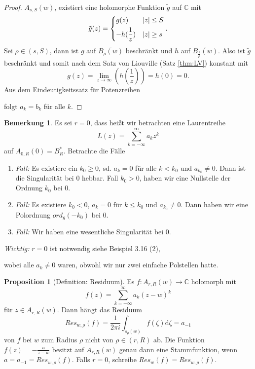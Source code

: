 \documentclass[11pt,titlepage]{article}
\theoremstyle{definition}
\newtheorem{proposition}[theorem]{Proposition}
\newtheorem{remark}[theorem]{Bemerkung}
\theoremstyle{remark}
\begin{document}
\begin{proof}
		$A_{s,S}(w)$, existiert eine holomorphe Funktion $\tilde{g}$ auf $\mathbb{C}$ mit 
		\[ \tilde{g}(z)=\begin{dcases} g(z) & |z|\leq S \\ -h(\frac{1}{z}) & |z| \geq s \end{dcases}. \]
		Sei $\rho\in (s,S)$, dann ist $g$ auf $\overline{B_{\rho}(w)}$ beschränkt und $h$ auf 
		$\overline{B_{\frac{1}{\rho}}(w)}$. Also ist $\tilde{g}$ beschränkt und somit nach dem Satz von 
		Liouville (Satz \ref{thm:LV}) konstant mit 
		\[ g(z)=\lim_{z\to\infty}\left(h\left(\frac{1}{z}\right)\right)=h(0)=0. \]
		Aus dem Eindeutigkeitssatz für Potenzreihen
		
		
		folgt $a_k =b_k$ für alle $k$.
	\end{proof}
	
	\begin{remark}
		Es sei $r=0$, dass heißt wir betrachten eine Laurentreihe
		\[ L(z)=\sum_{k=-\infty}^{\infty} a_k z^k \]
		auf $A_{0,R}(0)=B_R^*$. Betrachte die Fälle
		\begin{enumerate}
			\item \textsl{Fall:} Es existiere ein $k_0\geq 0$, sd. $a_k=0$ für alle $k<k_0$ und $a_{k_0}\neq 0$. 
			Dann ist die Singularität bei $0$ hebbar. Fall $k_0 >0$, haben wir eine Nullstelle der Ordnung 
			$k_0$ bei $0$.
			
			\item \textsl{Fall:} Es existiere $k_0 <0$, $a_k=0$ für $k\leq k_0$ und $a_{k_0}\neq0$. Dann 
			haben wir eine Polordnung $ord_g (-k_0)$ bei $0$.
			
			\item \textsl{Fall:} Wir haben eine wesentliche Singularität bei $0$.
		\end{enumerate}
		\textsl{Wichtig:} $r=0$ ist notwendig siehe Beispiel 3.16 (2), 
		
		
		wobei alle $a_k\neq 0$ waren, obwohl wir nur zwei einfache Polstellen hatte.
	\end{remark}
	
	\begin{proposition}[Definition: Residuum]
		Es $f:A_{r,R}(w)\to\mathbb{C}$ holomorph mit
		\[ f(z)=\sum_{k=-\infty}^{\infty} a_k (z-w)^k \]
		für $z\in A_{r,R}(w)$. Dann hängt das Residuum
		\[ Res_{w,\rho}(f)=\frac{1}{2\pi i}\int_{s_{\rho}(w)}f(\zeta)\mathrm{d}\zeta =a_{-1} \]
		von $f$ bei $w$ zum Radius $\rho$ nicht von $\rho\in (r,R)$ ab. Die Funktion $f(z)=-\frac{a}{z-w}$ 
		besitzt auf $A_{r,R}(w)$ genau dann eine Stammfunktion, wenn $a=a_{-1}=Res_{w,\rho}(f)$.
		Falls $r=0$, schreibe $Res_w(f)=Res_{w,\rho}(f)$.
	\end{proposition}
	
\end{document}
